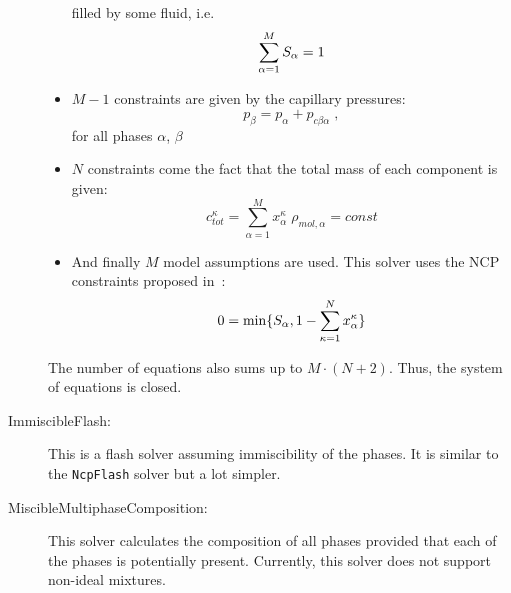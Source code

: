 \begin{description}
\begin{itemize}
    filled by some fluid, i.e.
    \[
    \sum_{\alpha=1}^M S_\alpha = 1
    \]
  \item $M - 1$ constraints are given by the capillary pressures:
    \[ 
    p_\beta = p_\alpha + p_{c\beta\alpha} \;,
    \]
    for all phases $\alpha$, $\beta$
  \item $N$ constraints come the fact that the total mass of each
    component is given:
    \[
    c^\kappa_{tot} = \sum_{\alpha=1}^M x_\alpha^\kappa\;\rho_{mol,\alpha} = const
    \]
  \item And finally $M$ model assumptions are used. This solver uses
    the NCP constraints proposed in~\cite{LHHW2011}:
    \[
     0 = \mathrm{min}\{S_\alpha, 1 - \sum_{\kappa=1}^N x_\alpha^\kappa\}
   \]
\end{itemize}
The number of equations also sums up to $M\cdot(N + 2)$. Thus, the
system of equations is closed.
\item[ImmiscibleFlash:] This is a flash solver assuming immiscibility
  of the phases. It is similar to the \texttt{NcpFlash} solver but a
  lot simpler.
\item[MiscibleMultiphaseComposition:] This solver calculates the
  composition of all phases provided that each of the phases is
  potentially present. Currently, this solver does not support
  non-ideal mixtures.
\end{description}

